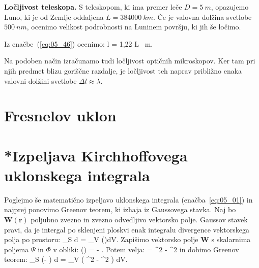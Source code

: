 \begin{example}{\bf Ločljivost teleskopa.}
S teleskopom, ki ima premer leče $D=5~\si{m}$, opazujemo
Luno, ki je od Zemlje oddaljena $L = 384 000~\si{km}$. Če je 
valovna dolžina svetlobe $500~\si{nm}$, ocenimo velikost podrobnosti
na Luninem površju, ki jih še ločimo.

Iz enačbe~(\ref{eq:05_46}) ocenimo:
\beq
\Delta l = 1,22  L ~\si{m}.
\label{eq:05_47}
\eeq
\end{example}

Na podoben način izračunamo tudi ločljivost optičnih mikroskopov. Ker
tam pri njih predmet blizu goriščne razdalje, je ločljivost
teh naprav približno enaka valovni dolžini svetlobe $\Delta l \approx \lambda$.

\section{Fresnelov uklon}

\section{*Izpeljava Kirchhoffovega uklonskega integrala}
Poglejmo še matematično izpeljavo uklonskega integrala (enačba~\ref{eq:05_01})
in najprej ponovimo Greenov teorem, ki izhaja iz Gaussovega stavka. Naj bo 
$\mathbf{W}(\mathbf{r})$ poljubno zvezno in zvezno odvedljivo vektorsko
polje. Gaussov stavek pravi, da je intergal po sklenjeni ploskvi enak
integralu divergence vektorskega polja po prostoru:
\beq
\oint_S  d = \int_V \div()dV.
\label{eq:05_48}
\eeq
Zapišimo  vektorsko polje $\mathbf{W}$ s skalarnima poljema $\Psi$ in $\Phi$
v obliki:
\beq
{}() = \Psi \nabla \Phi - \Phi \nabla \Psi.
\label{eq:05_49}
\eeq
Potem velja:
\beq
\div {}= \Psi \nabla^2 \Phi - \Phi \nabla^2 \Psi
\label{eq:05_50}
\eeq
in dobimo Greenov teorem:
\beq
\oint_S \left(\Psi \nabla \Phi - \Phi \nabla \Psi\right) d  =
\int_V \left( \Psi \nabla^2 \Phi - \Phi \nabla^2 \Psi \right) dV.
\label{eq:05_51}
\eeq

